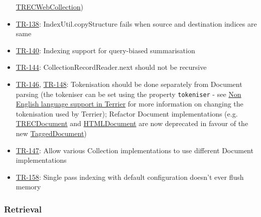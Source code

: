 \begin{itemize}
  \href{javadoc/org/terrier/indexing/TRECWebCollection.html}{TRECWebCollection})
\item
  \href{http://terrier.org/issues/browse/TR-138}{TR-138}:
  IndexUtil.copyStructure fails when source and destination indices are
  same
\item
  \href{http://terrier.org/issues/browse/TR-140}{TR-140}: Indexing
  support for query-biased summarisation
\item
  \href{http://terrier.org/issues/browse/TR-144}{TR-144}:
  CollectionRecordReader.next should not be recursive
\item
  \href{http://terrier.org/issues/browse/TR-146}{TR-146},
  \href{http://terrier.org/issues/browse/TR-148}{TR-148}: Tokenisation
  should be done separately from Document parsing (the tokeniser can be
  set using the property \texttt{tokeniser} - see
  \href{languages.html}{Non English language support in Terrier} for
  more information on changing the tokenisation used by Terrier);
  Refactor Document implementations (e.g.
  \href{javadoc/org/terrier/indexing/TRECDocument.html}{TRECDocument}
  and
  \href{javadoc/org/terrier/indexing/HTMLDocument.html}{HTMLDocument}
  are now deprecated in favour of the new
  \href{javadoc/org/terrier/indexing/TaggedDocument.html}{TaggedDocument})
\item
  \href{http://terrier.org/issues/browse/TR-147}{TR-147}: Allow various
  Collection implementations to use different Document implementations
\item
  \href{http://terrier.org/issues/browse/TR-158}{TR-158}: Single pass
  indexing with default configuration doesn't ever flush memory
\end{itemize}

\subsubsection{Retrieval}\label{retrieval-3}

